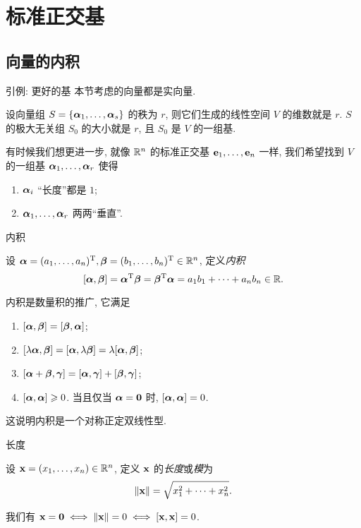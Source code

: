 \section{标准正交基}

\subsection{向量的内积}

\begin{frame}{引例: 更好的基}
	\onslide<+->
	本节考虑的向量都是实向量.

	\onslide<+->
	设向量组 $S=\{\bma_1,\dots,\bma_s\}$ 的秩为 $r$, 则它们生成的线性空间 $V$ 的维数就是 $r$.
	\onslide<+->
	$S$ 的极大无关组 $S_0$ 的大小就是 $r$, 且 $S_0$ 是 $V$ 的一组基.

	\onslide<+->
	有时候我们想更进一步, 就像 $\BR^n$ 的标准正交基 $\bfe_1,\dots,\bfe_n$ 一样, 我们希望找到 $V$ 的一组基 $\bma_1,\dots,\bma_r$ 使得
	\begin{enumerate}
		\item $\bma_i$ ``长度''都是 $1$;
		\item $\bma_1,\dots,\bma_r$ 两两``垂直''.
	\end{enumerate}
\end{frame}


\begin{frame}{内积}
	\onslide<+->
	\begin{definition}
		设 $\bma=(a_1,\dots,a_n)^\rmT,\bmb=(b_1,\dots,b_n)^\rmT\in\BR^n$, 定义\emph{内积}
		\[[\bma,\bmb]=\bma^\rmT\bmb=\bmb^\rmT\bma=a_1b_1+\cdots+a_nb_n\in\BR.\]
	\end{definition}
	\onslide<+->
	内积是数量积的推广, 它满足
	\onslide<+->
	\begin{enumerate}
		\item $[\bma,\bmb]=[\bmb,\bma]$;
		\item $[\lambda\bma,\bmb]=[\bma,\lambda\bmb]=\lambda[\bma,\bmb]$;
		\item $[\bma+\bmb,\bmg]=[\bma,\bmg]+[\bmb,\bmg]$;
		\item $[\bma,\bma]\ge 0$. 当且仅当 $\bma={\bf0}$ 时, $[\bma,\bma]=0$.
	\end{enumerate}
	\onslide<+->
	这说明内积是一个对称正定双线性型.
\end{frame}


\begin{frame}{长度}
	\onslide<+->
	\begin{definition}
		设 $\bfx=(x_1,\dots,x_n)\in\BR^n$, 定义 $\bfx$ 的\emph{长度}或\emph{模}为
		\[\|\bfx\|=\sqrt{x_1^2+\cdots+x_n^2}.\]
	\end{definition}
	\onslide<+->
	我们有 $\bfx={\bf0}\iff\|\bfx\|=0\iff[\bfx,\bfx]=0$.
\end{frame}


